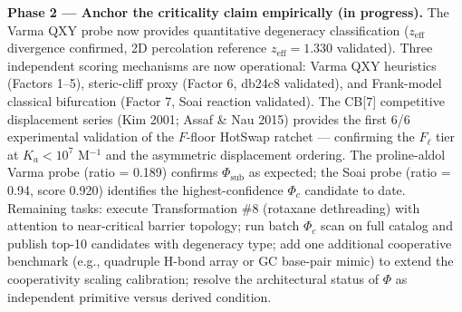 \documentclass[12pt,a4paper]{article}
\begin{document}
\textbf{Phase 2 --- Anchor the criticality claim empirically (in progress).} The Varma QXY probe now provides quantitative degeneracy classification ($z_{\text{eff}}$ divergence confirmed, 2D percolation reference $z_{\text{eff}} = 1.330$ validated). Three independent scoring mechanisms are now operational: Varma QXY heuristics (Factors 1--5), steric-cliff proxy (Factor 6, db24c8 validated), and Frank-model classical bifurcation (Factor 7, Soai reaction validated). The CB{[}7{]} competitive displacement series (Kim 2001; Assaf \& Nau 2015) provides the first 6/6 experimental validation of the $F$-floor HotSwap ratchet --- confirming the $F_{\ell}$ tier at $K_a < 10^7$ M$^{-1}$ and the asymmetric displacement ordering. The proline-aldol Varma probe (ratio = 0.189) confirms $\Phi_{\text{sub}}$ as expected; the Soai probe (ratio = 0.94, score 0.920) identifies the highest-confidence $\Phi_c$ candidate to date. Remaining tasks: execute Transformation \#8 (rotaxane dethreading) with attention to near-critical barrier topology; run batch $\Phi_c$ scan on full catalog and publish top-10 candidates with degeneracy type; add one additional cooperative benchmark (e.g., quadruple H-bond array or GC base-pair mimic) to extend the cooperativity scaling calibration; resolve the architectural status of $\Phi$ as independent primitive versus derived condition.
\end{document}
